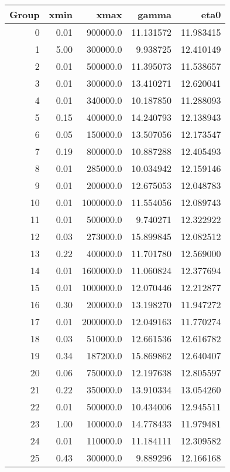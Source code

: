 \begin{tabular}{rrrrr}
\toprule
 Group &  xmin &       xmax &      gamma &       eta0 \\
\midrule
     0 &  0.01 &   900000.0 &  11.131572 &  11.983415 \\
     1 &  5.00 &   300000.0 &   9.938725 &  12.410149 \\
     2 &  0.01 &   500000.0 &  11.395073 &  11.538657 \\
     3 &  0.01 &   300000.0 &  13.410271 &  12.620041 \\
     4 &  0.01 &   340000.0 &  10.187850 &  11.288093 \\
     5 &  0.15 &   400000.0 &  14.240793 &  12.138943 \\
     6 &  0.05 &   150000.0 &  13.507056 &  12.173547 \\
     7 &  0.19 &   800000.0 &  10.887288 &  12.405493 \\
     8 &  0.01 &   285000.0 &  10.034942 &  12.159146 \\
     9 &  0.01 &   200000.0 &  12.675053 &  12.048783 \\
    10 &  0.01 &  1000000.0 &  11.554056 &  12.089743 \\
    11 &  0.01 &   500000.0 &   9.740271 &  12.322922 \\
    12 &  0.03 &   273000.0 &  15.899845 &  12.082512 \\
    13 &  0.22 &   400000.0 &  11.701780 &  12.569000 \\
    14 &  0.01 &  1600000.0 &  11.060824 &  12.377694 \\
    15 &  0.01 &  1000000.0 &  12.070446 &  12.212877 \\
    16 &  0.30 &   200000.0 &  13.198270 &  11.947272 \\
    17 &  0.01 &  2000000.0 &  12.049163 &  11.770274 \\
    18 &  0.03 &   510000.0 &  12.661536 &  12.616782 \\
    19 &  0.34 &   187200.0 &  15.869862 &  12.640407 \\
    20 &  0.06 &   750000.0 &  12.197638 &  12.805597 \\
    21 &  0.22 &   350000.0 &  13.910334 &  13.054260 \\
    22 &  0.01 &   500000.0 &  10.434006 &  12.945511 \\
    23 &  1.00 &   100000.0 &  14.778433 &  11.979481 \\
    24 &  0.01 &   110000.0 &  11.184111 &  12.309582 \\
    25 &  0.43 &   300000.0 &   9.889296 &  12.166168 \\
\bottomrule
\end{tabular}
